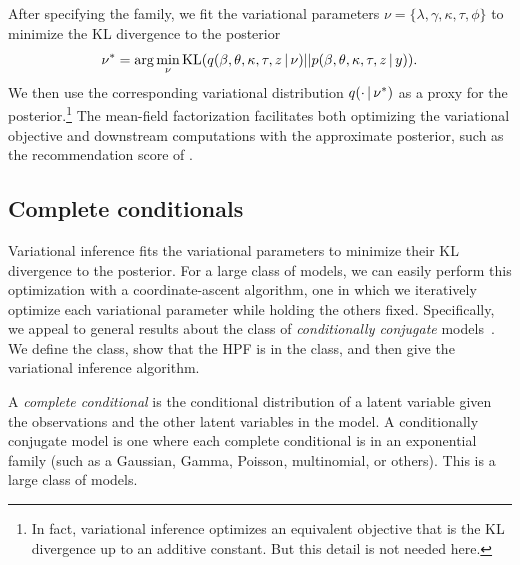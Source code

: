 \documentclass{sig-alternate}
\begin{document}
After specifying the family, we fit the variational parameters $\nu =
\{\lambda, \gamma, \kappa, \tau, \phi\}$ to minimize the KL divergence to the
posterior
\begin{equation*}
  \nu^* = \arg \min_\nu \textrm{KL}(q(\beta,
  \theta, \kappa, \tau, z \,\vert\, \nu) || p(\beta, \theta, \kappa, \tau, z \,\vert\, y)).
\end{equation*}
We then use the corresponding variational distribution $q(\cdot \,\vert\,
\nu^*)$ as a proxy for the posterior.\footnote{In fact, variational inference
optimizes an equivalent objective that is the KL divergence up to an
additive constant.  But this detail is not needed here.}  The
mean-field factorization facilitates both optimizing the variational
objective and downstream computations with the approximate posterior,
such as the recommendation score of .

\subsection{Complete conditionals}

Variational inference fits the variational parameters to minimize
their KL divergence to the posterior.  For a large class of models, we
can easily perform this optimization with a coordinate-ascent
algorithm, one in which we iteratively optimize each variational
parameter while holding the others fixed.  Specifically, we appeal to
general results about the class of \textit{conditionally conjugate}
models~\cite{Ghahramani:2001,Hoffman:2013}.  We define the class, show
that the HPF is in the class, and then give the variational inference
algorithm.

A \textit{complete conditional} is the conditional distribution of a
latent variable given the observations and the other latent variables
in the model.  A conditionally conjugate model is one where each
complete conditional is in an exponential family (such as a Gaussian,
Gamma, Poisson, multinomial, or others).  This is a large class of
models.
\end{document}
